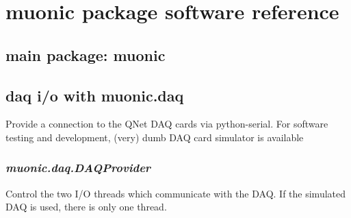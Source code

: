 \documentclass[letterpaper,10pt,english]{sphinxmanual}
\begin{document}
\section{muonic package software reference}
\label{muonic::doc}\label{muonic:muonic-package-software-reference}

\subsection{main package: muonic}
\label{muonic:module-muonic}\label{muonic:main-package-muonic}
{\hyperref[muonic:module-muonic.daq]{}}
{\hyperref[muonic:module-muonic.gui]{}}
{\hyperref[muonic:module-muonic.analysis]{}}


\subsection{daq i/o with muonic.daq}
\label{muonic:module-muonic.daq}\label{muonic:daq-i-o-with-muonic-daq}
Provide a connection to the QNet DAQ cards via python-serial. For software testing and development, (very) dumb DAQ card simulator is available


\subsubsection{\emph{muonic.daq.DAQProvider}}
\label{muonic:muonic-daq-daqprovider}
Control the two I/O threads which communicate with the DAQ. If the simulated DAQ is used, there is only one thread.
\label{muonic:module-muonic.daq.DAQProvider}
\end{document}
